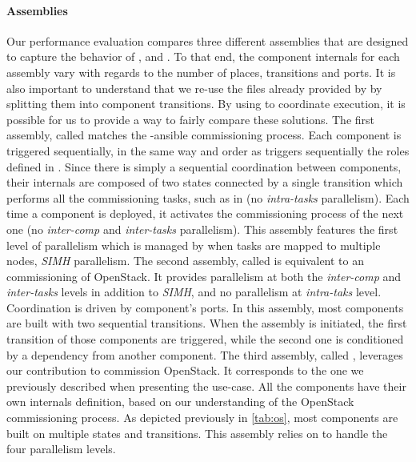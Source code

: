 \paragraph{Assemblies}
Our performance evaluation compares three different assemblies that
are designed to capture the behavior of \ansible, \aeolus and \mad. To
that end, the component internals for each assembly vary with regards
to the number of places, transitions and ports. It is also important
to understand that we re-use the \ansible files already provided by
\kolla by splitting them into component transitions. By using \mad to
coordinate \ansible execution, it is possible for us to provide a way
to fairly compare these solutions.  The first assembly, called \ansass
matches the \kolla-ansible commissioning process. Each component is
triggered sequentially, in the same way and order as \ansible triggers
sequentially the roles defined in \kolla. Since there is simply a
sequential coordination between components, their internals are
composed of two states connected by a single transition which performs
all the commissioning tasks, such as in \kolla (\ie no
\emph{intra-tasks} parallelism). Each time a component is deployed, it
activates the commissioning process of the next one (\ie no
\emph{inter-comp} and \emph{inter-tasks} parallelism). This assembly
features the first level of parallelism which is managed by \ansible
when tasks are mapped to multiple nodes, \ie \emph{SIMH} parallelism.
%
The second assembly, called \aeoass is equivalent to an \aeolus
commissioning of OpenStack. It provides parallelism at both the
\emph{inter-comp} and \emph{inter-tasks} levels in addition to
\emph{SIMH}, and no parallelism at \emph{intra-taks}
level. Coordination is driven by component's ports.  In this assembly,
most components are built with two sequential transitions.  When the
assembly is initiated, the first transition of those components are
triggered, while the second one is conditioned by a dependency from
another component.
%
The third assembly, called \madass, leverages our contribution to
commission OpenStack. It corresponds to the one we previously
described when presenting the use-case. All the components have their
own internals definition, based on our understanding of the OpenStack
commissioning process. As depicted previously in \cref{tab:os}, most
components are built on multiple states and transitions. This assembly
relies on \mad to handle the four parallelism levels.


